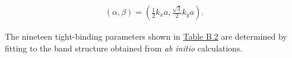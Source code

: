 \begin{equation}
	\begin{aligned}
		(\alpha,\beta) = \left(\frac{1}{2}k_{x}a,\frac{\sqrt{3}}{2}k_{y}a\right).
	\end{aligned}
\end{equation}

The nineteen tight-binding parameters shown in \hyperref[B.2]{Table B.2} are determined by fitting to the band structure obtained from \textit{ab initio} calculations.



